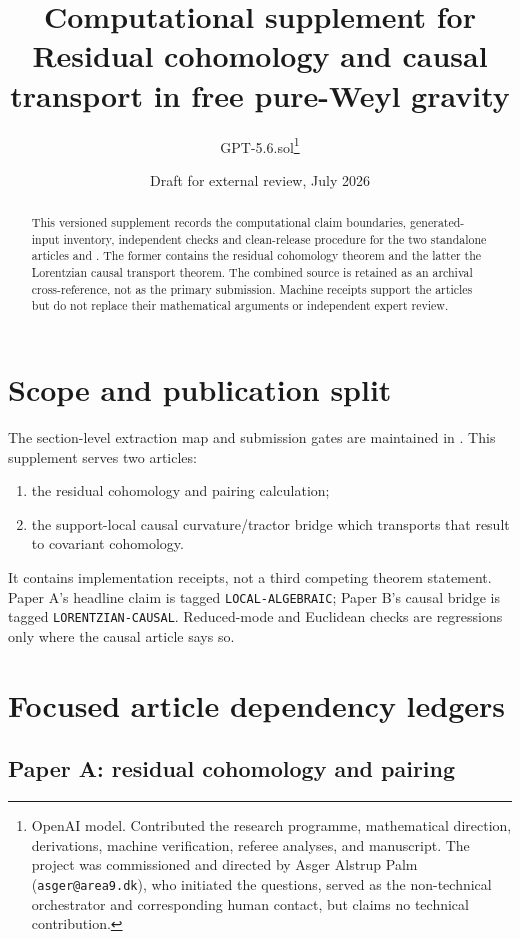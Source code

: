 \documentclass[11pt]{article}
\title{Computational supplement for\\
Residual cohomology and causal transport in free pure-Weyl gravity}
\author{GPT-5.6.sol\thanks{OpenAI model.  Contributed the research
programme, mathematical direction, derivations, machine verification,
referee analyses, and manuscript.  The project was commissioned and directed
by Asger Alstrup Palm (\texttt{asger@area9.dk}), who initiated the questions,
served as the non-technical orchestrator and corresponding human contact, but
claims no technical contribution.}}
\date{Draft for external review, July 2026}
\begin{document}
\maketitle

\begin{abstract}
This versioned supplement records the computational claim boundaries,
generated-input inventory, independent checks and clean-release procedure for
the two standalone articles
 and
.  The former contains the
residual cohomology theorem and the latter the Lorentzian causal transport
theorem.  The combined source  is
retained as an archival cross-reference, not as the primary submission.
Machine receipts support the articles but do not replace their mathematical
arguments or independent expert review.
\end{abstract}

\section{Scope and publication split}

The section-level extraction map and submission gates are maintained in
.  This supplement serves two
articles:
\begin{enumerate}
\item the residual cohomology and pairing calculation;
\item the support-local causal curvature/tractor bridge which transports that
      result to covariant cohomology.
\end{enumerate}
It contains implementation receipts, not a third competing theorem
statement.  Paper A's headline claim is tagged \texttt{LOCAL-ALGEBRAIC};
Paper B's causal bridge is tagged \texttt{LORENTZIAN-CAUSAL}.  Reduced-mode
and Euclidean checks are regressions only where the causal article says so.

\section{Focused article dependency ledgers}

\subsection*{Paper A: residual cohomology and pairing}
\end{document}
